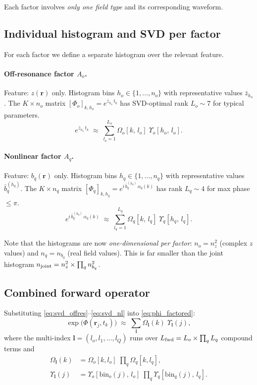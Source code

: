 \documentclass{article}
\begin{document}
Each factor involves \emph{only one field type} and its corresponding waveform.

\subsection{Individual histogram and SVD per factor}

For each factor we define a separate histogram over the relevant feature.

\paragraph{Off-resonance factor $A_o$.}
Feature: $z(\mathbf{r})$ only.  Histogram bins $h_o \in \{1,\ldots,n_o\}$ with
representative values $\bar{z}_{h_o}$.  The $K \times n_o$ matrix
$[\Phi_o]_{k,h_o} = e^{\bar{z}_{h_o}\,t_k}$
has SVD-optimal rank $L_o \sim 7$ for typical parameters.
\begin{equation}
    e^{\bar{z}_{h_o}\,t_k} \;\approx\; \sum_{l_o=1}^{L_o} \Omega_o[k,\,l_o]\;\Upsilon_o[h_o,\,l_o].
    \label{eq:svd_offres}
\end{equation}

\paragraph{Nonlinear factor $A_q$.}
Feature: $b_q(\mathbf{r})$ only.  Histogram bins $h_q \in \{1,\ldots,n_q\}$ with
representative values $\bar{b}_q^{(h_q)}$.  The $K \times n_q$ matrix
$[\Phi_q]_{k,h_q} = e^{i\,\bar{b}_q^{(h_q)}\,\alpha_q(k)}$
has rank $L_q \sim 4$ for max phase $\leq \pi$.
\begin{equation}
    e^{i\,\bar{b}_q^{(h_q)}\,\alpha_q(k)} \;\approx\; \sum_{l_q=1}^{L_q} \Omega_q[k,\,l_q]\;\Upsilon_q[h_q,\,l_q].
    \label{eq:svd_nl}
\end{equation}

Note that the histograms are now \emph{one-dimensional per factor}: $n_o = n_z^2$
(complex $z$ values) and $n_q = n_{b_q}$ (real field values).  This is far smaller
than the joint histogram $n_{\rm joint} = n_z^2 \times \prod_q n_{b_q}^2$.

\subsection{Combined forward operator}

Substituting \eqref{eq:svd_offres}--\eqref{eq:svd_nl} into \eqref{eq:phi_factored}:
\begin{equation}
    \exp\bigl(\Phi(\mathbf{r}_j, t_k)\bigr) \;\approx\;
    \sum_{\boldsymbol{l}} \Omega_{\boldsymbol{l}}(k)\;\Upsilon_{\boldsymbol{l}}(j),
    \label{eq:factored_approx}
\end{equation}
where the multi-index $\boldsymbol{l} = (l_o, l_1, \ldots, l_Q)$ runs over
$L_{\rm fwd} = L_o \times \prod_q L_q$ compound terms and
\begin{align}
    \Omega_{\boldsymbol{l}}(k)   &= \Omega_o[k,l_o]\;\prod_q \Omega_q[k,l_q], \\
    \Upsilon_{\boldsymbol{l}}(j) &= \Upsilon_o[\mathrm{bin}_o(j),\,l_o]\;\prod_q \Upsilon_q[\mathrm{bin}_q(j),\,l_q].
\end{align}
\end{document}
